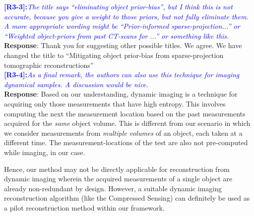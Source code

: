 \documentclass[11pt]{article}
\begin{document}
\vspace{0.5cm}\textcolor{blue}{\textbf{[R3-3]:}\textit{The title says ``eliminating object prior-bias'', but I think this is not accurate, because you give a weight to those priors, but not fully eliminate them. A more appropriate wording might be ``Prior-informed sparse-projection...'' or ``Weighted object-priors from past CT-scans for ...'' or something like this.}}\\

\textbf{Response}: Thank you for suggesting other possible titles. We
agree. We have changed the title to ``Mitigating object prior-bias from sparse-projection tomographic reconstructions''\\


\vspace{0.5cm}\textcolor{blue}{\textbf{[R3-4]:}\textit{As a final remark, the authors can also use this technique for imaging dynamical samples. A discussion would be nice.}}\\

\textbf{Response}: Based on our understanding, dynamic imaging is a technique for acquiring only those measurements that have high entropy. This involves computing the next the measurement location based on the past measurements acquired for the \textit{same} object volume. This is different from our scenario in which we consider measurements from \textit{multiple volumes} of an object, each taken at a different time. The measurement-locations of the test are also not pre-computed while imaging, in our case. 

Hence, our method may not be directly applicable for reconstruction from dynamic imaging wherein the acquired measurements of a single object are already non-redundant by design. However, a suitable dynamic imaging reconstruction algorithm (like the Compressed Sensing)  can definitely be used as a pilot reconstruction method within our framework. 



    
  
\end{document}
